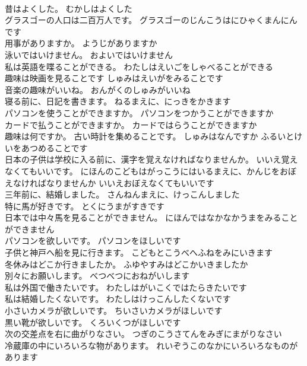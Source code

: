 \documentclass[8pt]{extreport}
\begin{document}
\begin{CJK}{UTF8}{min}
\\	昔はよくした。	むかしはよくした 
\\	グラスゴーの人口は二百万人です。	グラスゴーのじんこうはにひゃくまんにんです 
\\	用事がありますか。	ようじがありますか 
\\	泳いではいけません。	およいではいけません 
\\	私は英語を喋ることができる。	わたしはえいごをしゃべることができる 
\\	趣味は映画を見ることです	しゅみはえいがをみることです 
\\	音楽の趣味がいいね。	おんがくのしゅみがいいね 
\\	寝る前に、日記を書きます。	ねるまえに、にっきをかきます 
\\	パソコンを使うことができますか。	パソコンをつかうことができますか 
\\	カードで払うことができますか。	カードではらうことができますか 
\\	趣味は何ですか。 古い時計を集めることです。	しゅみはなんですか ふるいとけいをあつめることです 
\\	日本の子供は学校に入る前に、漢字を覚えなければなりませんか。 いいえ覚えなくてもいいです。	にほんのこどもはがっこうにはいるまえに、かんじをおぼえなければなりませんか いいえおぼえなくてもいいです 
\\	三年前に、結婚しました。	さんねんまえに、けっこんしました 
\\	特に馬が好きです。	とくにうまがすきです 
\\	日本では中々馬を見ることができません。	にほんではなかなかうまをみることができません 
\\	パソコンを欲しいです。	パソコンをほしいです 
\\	子供と神戸へ船を見に行きます。	こどもとこうべへふねをみにいきます 
\\	冬休みはどこか行きましたか。	ふゆやすみはどこかいきましたか 
\\	別々にお願いします。	べつべつにおねがいします 
\\	私は外国で働きたいです。	わたしはがいこくではたらきたいです 
\\	私は結婚したくないです。	わたしはけっこんしたくないです 
\\	小さいカメラが欲しいです。	ちいさいカメラがほしいです 
\\	黒い靴が欲しいです。	くろいくつがほしいです 
\\	次の交差点を右に曲がりなさい。	つぎのこうさてんをみぎにまがりなさい 
\\	冷蔵庫の中にいろいろな物があります。	れいぞうこのなかにいろいろなものがあります 

\end{CJK}
\end{document}

